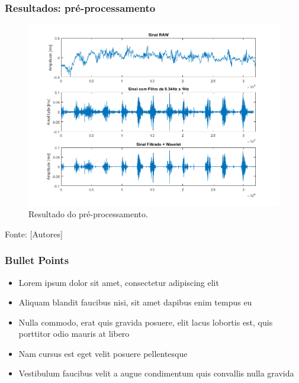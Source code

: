 \documentclass{beamer}
\begin{document}
\begin{frame}
	\frametitle{Resultados: pré-processamento}	
	
	\begin{figure}[H]
		\caption{\label{sinais} Resultado do pré-processamento.}
		\begin{center}
			\includegraphics[scale=0.33]{imagens/sinais.png} 		
		\end{center}
	\end{figure}
	
	Fonte: [Autores]
	
\end{frame}


\begin{frame}
\frametitle{Bullet Points}
\begin{itemize}
\item Lorem ipsum dolor sit amet, consectetur adipiscing elit
\item Aliquam blandit faucibus nisi, sit amet dapibus enim tempus eu
\item Nulla commodo, erat quis gravida posuere, elit lacus lobortis est, quis porttitor odio mauris at libero
\item Nam cursus est eget velit posuere pellentesque
\item Vestibulum faucibus velit a augue condimentum quis convallis nulla gravida
\end{itemize}
\end{frame}

\end{document}
